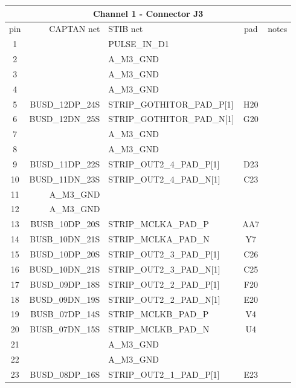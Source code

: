 \documentclass[11pt]{article}
\begin{document}
\begin{table}
\begin{center}
\scriptsize
\begin{tabular}{|c|r|l|c|l|} \hline
\multicolumn{5}{|c|}{Channel 1 - Connector J3} \\ \hline
pin & CAPTAN net    & STIB net & pad & notes \\ \hline\hline
 1 &               & PULSE\_IN\_D1  & & \\
 2 &               & A\_M3\_GND  & & \\ \hline
 3 &               & A\_M3\_GND & & \\
 4 &               & A\_M3\_GND & & \\ \hline
 5 & BUSD\_12DP\_24S & STRIP\_GOTHITOR\_PAD\_P[1] & H20 & \\
 6 & BUSD\_12DN\_25S & STRIP\_GOTHITOR\_PAD\_N[1] & G20 & \\ \hline
 7 &               & A\_M3\_GND                &   &   \\
 8 &               & A\_M3\_GND                &    &  \\ \hline
 9 & BUSD\_11DP\_22S & STRIP\_OUT2\_4\_PAD\_P[1]   & D23&  \\
10 & BUSD\_11DN\_23S & STRIP\_OUT2\_4\_PAD\_N[1]   & C23&  \\ \hline
11 &      A\_M3\_GND &                         &    &  \\
12 &      A\_M3\_GND &                         &    &  \\ \hline
13 & BUSB\_10DP\_20S & STRIP\_MCLKA\_PAD\_P       & AA7&  \\
14 & BUSB\_10DN\_21S & STRIP\_MCLKA\_PAD\_N       & Y7&  \\ \hline
15 & BUSD\_10DP\_20S & STRIP\_OUT2\_3\_PAD\_P[1]   & C26 & \\
16 & BUSD\_10DN\_21S & STRIP\_OUT2\_3\_PAD\_N[1]   & C25 & \\ \hline
17 & BUSD\_09DP\_18S & STRIP\_OUT2\_2\_PAD\_P[1]   & F20 & \\
18 & BUSD\_09DN\_19S & STRIP\_OUT2\_2\_PAD\_N[1]   & E20 & \\ \hline
19 & BUSB\_07DP\_14S & STRIP\_MCLKB\_PAD\_P       & V4 & \\
20 & BUSB\_07DN\_15S & STRIP\_MCLKB\_PAD\_N       & U4 & \\ \hline
21 &               & A\_M3\_GND                &    & \\
22 &               & A\_M3\_GND                &    & \\ \hline
23 & BUSD\_08DP\_16S & STRIP\_OUT2\_1\_PAD\_P[1]   & E23 & \\

\end{tabular}
\end{center}
\end{table}
\end{document}
